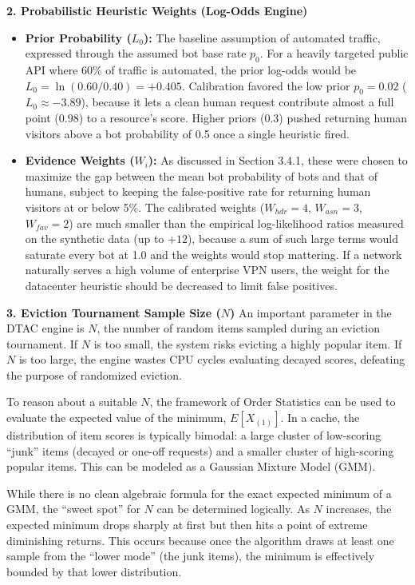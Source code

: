 \textbf{2. Probabilistic Heuristic Weights (Log-Odds Engine)}
\begin{itemize}
    \item \textbf{Prior Probability ($L_0$):} The baseline assumption of automated traffic, expressed through the assumed bot base rate $p_0$. For a heavily targeted public API where 60\% of traffic is automated, the prior log-odds would be $L_0 = \ln(0.60 / 0.40) = +0.405$. Calibration favored the low prior $p_0 = 0.02$ ($L_0 \approx -3.89$), because it lets a clean human request contribute almost a full point ($0.98$) to a resource's score. Higher priors (0.3) pushed returning human visitors above a bot probability of 0.5 once a single heuristic fired.
    \item \textbf{Evidence Weights ($W_i$):} As discussed in Section 3.4.1, these were chosen to maximize the gap between the mean bot probability of bots and that of humans, subject to keeping the false-positive rate for returning human visitors at or below 5\%. The calibrated weights ($W_{hdr} = 4$, $W_{asn} = 3$, $W_{fav} = 2$) are much smaller than the empirical log-likelihood ratios measured on the synthetic data (up to $+12$), because a sum of such large terms would saturate every bot at 1.0 and the weights would stop mattering. If a network naturally serves a high volume of enterprise VPN users, the weight for the datacenter heuristic should be decreased to limit false positives.
\end{itemize}

\textbf{3. Eviction Tournament Sample Size ($N$)}
An important parameter in the DTAC engine is $N$, the number of random items sampled during an eviction tournament. If $N$ is too small, the system risks evicting a highly popular item. If $N$ is too large, the engine wastes CPU cycles evaluating decayed scores, defeating the purpose of randomized eviction.

To reason about a suitable $N$, the framework of Order Statistics can be used to evaluate the expected value of the minimum, $E[X_{(1)}]$. In a cache, the distribution of item scores is typically bimodal: a large cluster of low-scoring ``junk'' items (decayed or one-off requests) and a smaller cluster of high-scoring popular items. This can be modeled as a Gaussian Mixture Model (GMM).

While there is no clean algebraic formula for the exact expected minimum of a GMM, the ``sweet spot'' for $N$ can be determined logically. As $N$ increases, the expected minimum drops sharply at first but then hits a point of extreme diminishing returns. This occurs because once the algorithm draws at least one sample from the ``lower mode'' (the junk items), the minimum is effectively bounded by that lower distribution.

